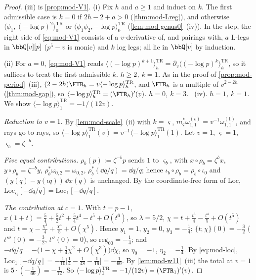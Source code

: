 \begin{proof}
(iii) is \cref{prop:mod-V1}. (i) Fix $h$ and $a\geq 1$ and induct on $k$. The first admissible case is $k=0$ if $2h-2+a>0$ (\cref{thm:mod-Lreg}), and otherwise $\langle\phi_1,(-\log p)^2\rangle^{\mathrm{TR}}_0$ or $\langle\phi_1\phi_2,-\log p\rangle^{\mathrm{TR}}_0$ (\cref{lem:mod-genus0}~(iv)). In the step, the right side of \eqref{eq:mod-V1} consists of a $v$-derivative of, and pairings with, $a$ L-legs in $\bbQ[v][p]$ ($p^5-v$ is monic) and $k$ log legs; all lie in $\bbQ[v]$ by induction.

(ii) For $a=0$, \eqref{eq:mod-V1} reads $\langle(-\log p)^{k+1}\rangle^{\mathrm{TR}}_h=\partial_v\langle(-\log p)^k\rangle^{\mathrm{TR}}_h$, so it suffices to treat the first admissible $k$. \emph{$h\geq 2$, $k=1$.} As in the proof of \cref{prop:mod-period}~(iii), $(2-2h)\FTR_h=v\langle-\log p\rangle^{\mathrm{TR}}_h$, and $\FTR_h$ is a multiple of $v^{2-2h}$ (\cref{thm:mod-gap}), so $\langle-\log p\rangle^{\mathrm{TR}}_h=(\FTR_h)'(v)$. \emph{$h=0$, $k=3$.} ~(iv). \emph{$h=1$, $k=1$.} We show $\langle-\log p\rangle^{\mathrm{TR}}_1=-1/(12v)$.

\emph{Reduction to $v=1$.} By \cref{lem:mod-scale}~(ii) with $k=\varsigma$, $m_\varsigma^*\omega^{(v)}_{1,1}=v^{-1}\omega^{(1)}_{1,1}$, and rays go to rays, so $\langle-\log p\rangle^{\mathrm{TR}}_1(v)=v^{-1}\langle-\log p\rangle^{\mathrm{TR}}_1(1)$. Let $v=1$, $\varsigma=1$, $\varsigma_b=\zeta^{-b}$.

\emph{Five equal contributions.} $\rho_b(p):=\zeta^{-b}p$ sends $1$ to $\varsigma_b$, with $x\circ\rho_b=\zeta^bx$, $y\circ\rho_b=\zeta^{-b}y$, $\rho_b^*\omega_{0,2}=\omega_{0,2}$, $\rho_b^*(\dd q/q)=\dd q/q$; hence $\iota_b\circ\rho_b=\rho_b\circ\iota_0$ and $(y(q)-y(\iota q))\,\dd x(q)$ is unchanged. By the coordinate-free form of $\mathrm{Loc}$, $\mathrm{Loc}_{\varsigma_b}[-\dd q/q]=\mathrm{Loc}_1[-\dd q/q]$.

\emph{The contribution at $c=1$.} With $t=p-1$, $x(1+t)=\frac54+\frac52t^2+\frac54t^4-t^5+O(t^6)$, so $\lambda=5/2$, $\chi=t+\frac{t^3}4-\frac{t^4}5+O(t^5)$ and $t=\chi-\frac{\chi^3}4+\frac{\chi^4}5+O(\chi^5)$. Hence $y_1=1$, $y_2=0$, $y_3=-\frac14$; $\{t;\chi\}(0)=-\frac32$ ($t'''(0)=-\frac32$, $t''(0)=0$), so $\mathrm{reg}_{00}=-\frac14$; and $-\dd q/q=-\big(1-\chi+\frac14\chi^2+O(\chi^3)\big)\dd\chi$, so $\eta_0=-1$, $\eta_2=-\frac14$. By \eqref{eq:mod-loc}, $\mathrm{Loc}_1[-\dd q/q]=-\frac1{10}\big[\frac14-\frac1{48}-\frac1{16}\big]=-\frac1{60}$. By \cref{lem:mod-w11}~(iii) the total at $v=1$ is $5\cdot(-\frac1{60})=-\frac1{12}$. So $\langle-\log p\rangle^{\mathrm{TR}}_1=-1/(12v)=(\FTR_1)'(v)$.
\end{proof}



